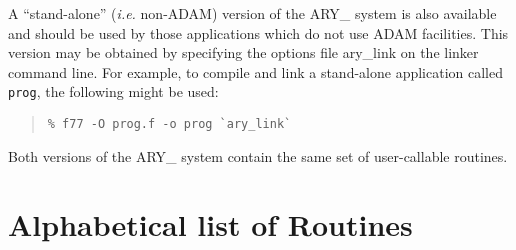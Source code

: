 \documentclass[twoside,11pt]{article}
\newcommand{\xlabel}[1]{}
\begin{document}
A ``stand-alone'' (\emph{i.e.} non-ADAM) version of the ARY\_ system is
also available and should be used by those applications which do not
use ADAM facilities.  This version may be obtained by specifying the
options file \mbox{ary\_link} on the linker command line.  For example,
to compile and link a stand-alone application called \texttt{prog}, the
following might be used:

\begin{quote}\begin{verbatim}
% f77 -O prog.f -o prog `ary_link`
\end{verbatim}\end{quote}

Both versions of the ARY\_ system contain the same set of user-callable
routines.

\newpage
\appendix

\section{\xlabel{alphabetical_list_of_routines}Alphabetical list of Routines}
\label{alphabetical_list_of_routines}
\end{document}
